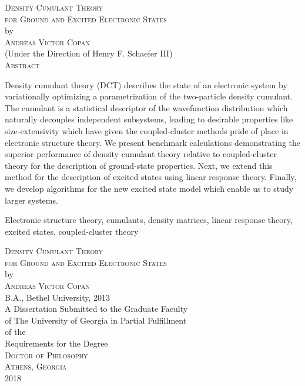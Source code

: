 \documentclass[12pt,notitlepage]{report}
\newcommand{\dissertationtitle}{%
    Density Cumulant Theory\\for Ground and Excited Electronic States}
\newcommand{\whoami}{Andreas Victor Copan}
\begin{document}
\newpage
\thispagestyle{empty}
\vspace*{15pt}
\begin{samepage}
\begin{center}
\textsc{\large{\dissertationtitle}}\\[15pt]
by\\[15pt]
\textsc{\whoami}\\[12pt]
(Under the Direction of Henry F. Schaefer III)\\[12pt]
\textsc{Abstract}
\end{center}
Density cumulant theory (DCT) describes the state of an electronic system by
variationally optimizing a parametrization of the two-particle density cumulant.
The cumulant is a statistical descriptor of the wavefunction distribution which
naturally decouples independent subsystems, leading to desirable properties like
size-extensivity which have given the coupled-cluster methods pride of place in
electronic structure theory.
We present benchmark calculations demonstrating the superior performance of
density cumulant theory relative to coupled-cluster theory for the description
of ground-state properties.
Next, we extend this method for the description of excited states using linear
response theory.
Finally, we develop algorithms for the new excited state model which enable us
to study larger systems.
\thispagestyle{empty}
\begin{list}{\textsc{Index words:\hfill}}{\leftmargin 1.4in}
\item 
\begin{flushleft}\singlespacing
    Electronic structure theory, cumulants, density matrices, linear response
    theory, excited states, coupled-cluster theory
\end{flushleft}
\end{list}
\end{samepage}

\newpage
{}
\thispagestyle{empty}
\vspace*{18pt}
\begin{center}
\textsc{\large{\dissertationtitle}}\\[18pt]
by\\[18pt]
\textsc{\whoami}\\[12pt]
B.A., Bethel University, 2013\\
\vfill
A Dissertation Submitted to the Graduate Faculty \\
of The University of Georgia in Partial Fulfillment \\
of the \\
Requirements for the Degree \\[10pt]
\textsc{Doctor of Philosophy}\\[36pt]
\textsc{Athens, Georgia}\\[18pt]
2018
\end{center}
\end{document}
